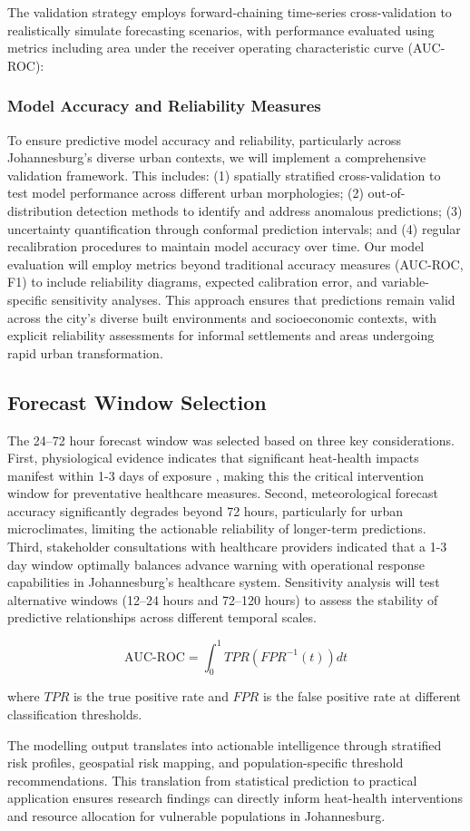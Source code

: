 The validation strategy employs forward-chaining time-series cross-validation to realistically simulate forecasting scenarios, with performance evaluated using metrics including area under the receiver operating characteristic curve (AUC-ROC):

\subsubsection{Model Accuracy and Reliability Measures}
To ensure predictive model accuracy and reliability, particularly across Johannesburg's diverse urban contexts, we will implement a comprehensive validation framework. This includes: (1) spatially stratified cross-validation to test model performance across different urban morphologies; (2) out-of-distribution detection methods to identify and address anomalous predictions; (3) uncertainty quantification through conformal prediction intervals; and (4) regular recalibration procedures to maintain model accuracy over time. Our model evaluation will employ metrics beyond traditional accuracy measures (AUC-ROC, F1) to include reliability diagrams, expected calibration error, and variable-specific sensitivity analyses. This approach ensures that predictions remain valid across the city's diverse built environments and socioeconomic contexts, with explicit reliability assessments for informal settlements and areas undergoing rapid urban transformation.

\subsection{Forecast Window Selection}
The 24--72 hour forecast window was selected based on three key considerations. First, physiological evidence indicates that significant heat-health impacts manifest within 1-3 days of exposure \citep{Gasparrini2015, Kinney2020}, making this the critical intervention window for preventative healthcare measures. Second, meteorological forecast accuracy significantly degrades beyond 72 hours, particularly for urban microclimates, limiting the actionable reliability of longer-term predictions. Third, stakeholder consultations with healthcare providers indicated that a 1-3 day window optimally balances advance warning with operational response capabilities in Johannesburg's healthcare system. Sensitivity analysis will test alternative windows (12--24 hours and 72--120 hours) to assess the stability of predictive relationships across different temporal scales.

\begin{equation}
\text{AUC-ROC} = \int^1_0 TPR(FPR^{-1}(t))dt
\end{equation}

where $TPR$ is the true positive rate and $FPR$ is the false positive rate at different classification thresholds.

The modelling output translates into actionable intelligence through stratified risk profiles, geospatial risk mapping, and population-specific threshold recommendations. This translation from statistical prediction to practical application ensures research findings can directly inform heat-health interventions and resource allocation for vulnerable populations in Johannesburg.